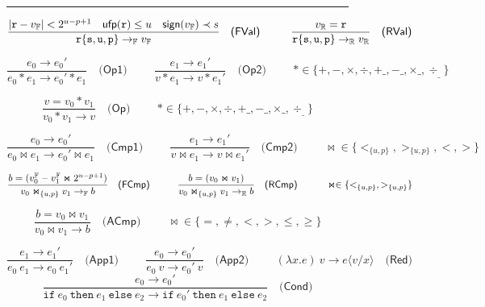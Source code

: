 
\begin{figure}[tb]
\hrule
\vspace{0.1cm}
$$
\frac{|\mathtt{r}-v_{\mathbb{F}}|< 2^{u-p+1} \quad \mathsf{ufp}(\mathtt{r})\le u\quad \mathsf{sign}(v_{\mathbb{F}})\prec s}
     {\mathtt{r\{s,u,p\} } \rightarrow_{\mathbb{F}} v_{\mathbb{F}}}\quad\textsf{(FVal)}
\hspace{1cm}
\frac{v_{\mathbb{R}}=\mathtt{r}}
     {\mathtt{r\{s,u,p\} } \rightarrow_{\mathbb{R}} v_{\mathbb{R}}}\quad\textsf{(RVal)}
$$

$$
\frac{e_0 \rightarrow e_0'}
     {e_0\ast e_1 \rightarrow e_0'\ast e_1}\quad\textsf{(Op1)}
\hspace{1cm}
\frac{e_1 \rightarrow e_1'}
     {v\ast e_1 \rightarrow v\ast  e_1'}\quad\textsf{(Op2)}\hspace{1cm}\ast\in\{+,-,\times,\div,+\_,-\_,\times\_,\div_\_\}
$$


$$
\frac{v=v_0\ast v_1}
     {v_0\ast v_1 \rightarrow v}\quad\textsf{(Op)}\hspace{1cm}\ast\in\{+,-,\times,\div,+\_,-\_,\times\_,\div_\_\}
$$



$$
\frac{e_0 \rightarrow e_0'}
     {e_0\Join e_1 \rightarrow e_0'\Join e_1}\quad\textsf{(Cmp1)}
\hspace{1cm}
\frac{e_1 \rightarrow e_1'}
     {v\Join e_1 \rightarrow v\Join e_1'}\quad\textsf{(Cmp2)}
\hspace{1cm}\Join\in\{<_{\{u,p\}},>_{\{u,p\}},<,>\}
$$

$$
\frac{ b=(v_0^\bbf- v_1^\bbf\Join 2^{u-p+1})
}
     {v_0\Join_{\{u,p\}} v_1 \rightarrow_\bbf b}\quad\textsf{(FCmp)}
\hspace{1cm}%
\frac{b=(v_0\Join v_1)
}
     {v_0\Join_{\{u,p\}} v_1 \rightarrow_\bbr b}\quad\textsf{(RCmp)}
\hspace{1cm}\Join\in\{<_{\{u,p\}},>_{\{u,p\}}\}
$$

$$
\frac{b=v_0\Join v_1}
     {v_0\Join v_1 \rightarrow b}\quad\textsf{(ACmp)}
\hspace{1cm}\Join\in\{=,\not=,<,>,\le,\ge\}
$$


$$
\frac{e_1 \rightarrow e_1'}
     {e_0\ e_1 \rightarrow e_0\ e_1'}\quad\textsf{(App1)}
\hspace{1cm}
\frac{e_0 \rightarrow e_0'}
     {e_0\ v \rightarrow e_0'\ v}\quad\textsf{(App2)}
\hspace{1cm}
     {(\lambda x.e)\ v\rightarrow e\langle v/x\rangle}\quad\textsf{(Red)}
$$
$$
\frac{e_0 \rightarrow e_0'}
     {\mathtt{if}\ e_0\ \mathtt{then}\ e_1\ \mathtt{else}\ e_2
      \rightarrow \mathtt{if}\ e_0'\ \mathtt{then}\ e_1\ \mathtt{else}\ e_2
     }\quad\textsf{(Cond)}
$$


\end{figure}
